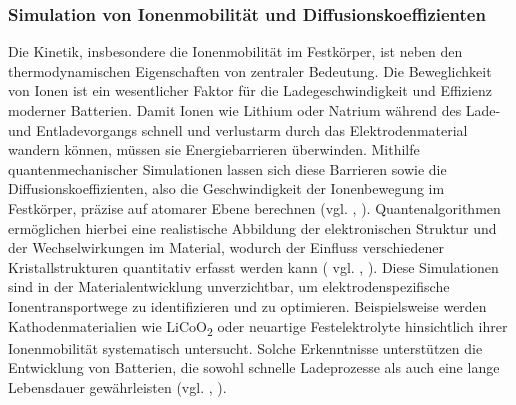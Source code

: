 \subsubsection{Simulation von Ionenmobilität und Diffusionskoeffizienten}
Die Kinetik, insbesondere die Ionenmobilität im Festkörper, ist neben den thermodynamischen Eigenschaften von zentraler Bedeutung. Die Beweglichkeit von Ionen ist ein wesentlicher Faktor für die Ladegeschwindigkeit und Effizienz moderner Batterien. Damit Ionen wie Lithium oder Natrium während des Lade- und Entladevorgangs schnell und verlustarm durch das Elektrodenmaterial wandern können, müssen sie Energiebarrieren überwinden. Mithilfe quantenmechanischer Simulationen lassen sich diese Barrieren sowie die Diffusionskoeffizienten, also die Geschwindigkeit der Ionenbewegung im Festkörper, präzise auf atomarer Ebene berechnen (vgl. \cite{hanaor_computational_2024}, \cite{urban_computational_2016}). Quantenalgorithmen ermöglichen hierbei eine realistische Abbildung der elektronischen Struktur und der Wechselwirkungen im Material, wodurch der Einfluss verschiedener Kristallstrukturen quantitativ erfasst werden kann ( vgl. \cite{aspuru-guzik_simulated_2005}, \cite{baker_simulating_2024}).
Diese Simulationen sind in der Materialentwicklung unverzichtbar, um elektrodenspezifische Ionentransportwege zu identifizieren und zu optimieren. Beispielsweise werden Kathodenmaterialien wie LiCoO\textsubscript{2} oder neuartige Festelektrolyte hinsichtlich ihrer Ionenmobilität systematisch untersucht. Solche Erkenntnisse unterstützen die Entwicklung von Batterien, die sowohl schnelle Ladeprozesse als auch eine lange Lebensdauer gewährleisten (vgl. \cite{hanaor_computational_2024}, \cite{urban_computational_2016}).

